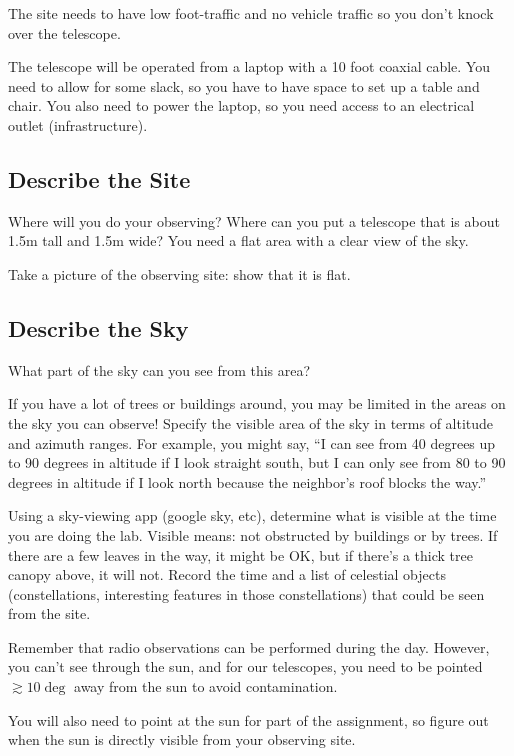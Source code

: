 \documentclass[11pt]{article}
\begin{document}
The site needs to have low foot-traffic and no vehicle traffic so you don't
knock over the telescope.

The telescope will be operated from a laptop with a 10 foot coaxial cable.  You
need to allow for some slack, so you have to have space to set up a table and
chair.  You also need to power the laptop, so you need access to an electrical
outlet (infrastructure).

\subsection{Describe the Site}

Where will you do your observing?  Where can you put a telescope that is about 1.5m tall and 1.5m wide?
You need a flat area with a clear view of the sky.

Take a picture of the observing site: show that it is flat.

\subsection{Describe the Sky}

What part of the sky can you see from this area?

If you have a lot of trees or buildings around, you may be limited in
the areas on the sky you can observe!  Specify the visible area of the sky in terms of altitude and azimuth ranges.
For example, you might say, ``I can see from 40 degrees up to 90 degrees in altitude if I look straight south, but
I can only see from 80 to 90 degrees in altitude if I look north because the neighbor's roof blocks the way.''

Using a sky-viewing app (google sky, etc), determine what is visible at the time you are doing the lab.
Visible means: not obstructed by buildings or by trees.  If there are a few leaves in the way, it
might be OK, but if there's a thick tree canopy above, it will not.
Record the time and a list of celestial objects (constellations, interesting features in those constellations)
that could be seen from the site.

Remember that radio observations can be performed during the day.  However, you can't see through the sun,
and for our telescopes, you need to be pointed $\gtrsim10\deg$ away from the sun to avoid contamination.

You will also need to point at the sun for part of the assignment, so figure out when the sun is directly
visible from your observing site.
\end{document}
